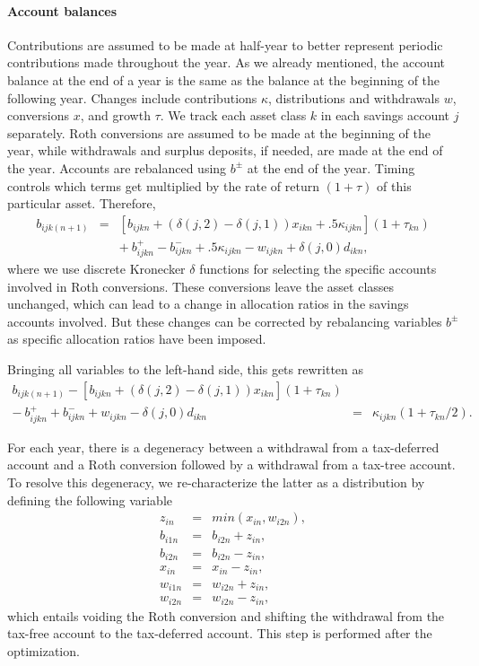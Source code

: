 \documentclass{article}[fleqn,12pt]
\begin{document}
\paragraph*{Account balances}
	Contributions are assumed to be made at half-year to better represent periodic contributions
	made throughout the year. As we already mentioned,
	the account balance at the end of a year is the same as the balance
	at the beginning of the following year.
	Changes include contributions $\kappa$, distributions and withdrawals $w$,
	conversions $x$, and growth $\tau$.
	We track each asset class $k$ in each savings account $j$ separately.
	Roth conversions are assumed to be made at the beginning of the year, while withdrawals
	and surplus deposits, if needed, are made at the end of the year.
	Accounts are rebalanced using $b^{\pm}$ at the end of the year.
	Timing controls which terms get multiplied by the rate of return $(1 + \tau)$
	of this particular asset.
	Therefore,
	\begin{eqnarray}
		\label{Eq:C3a}
		b_{ijk(n+1)} &=& [b_{ijkn} + (\delta(j, 2) - \delta(j, 1))x_{ikn} 
		+ .5\kappa_{ijkn}](1 + \tau_{kn})
		\nonumber \\
		&& 
		+\ b^+_{ijkn} - b^-_{ijkn} 
		+ .5 \kappa_{ijkn} - w_{ijkn} + \delta(j, 0)d_{ikn},
	\end{eqnarray}
	where we use discrete Kronecker $\delta$ functions for selecting the specific accounts involved
	in Roth conversions. These conversions leave the asset classes unchanged, which can lead to a
	change in allocation ratios in the savings accounts involved. But these changes
	can be corrected by rebalancing variables $b^\pm$ as
	specific allocation ratios have been imposed.

	Bringing all variables
	to the left-hand side, this gets rewritten as
	\begin{eqnarray}
		\label{Eq:C3}
		b_{ijk(n+1)} - [b_{ijkn} + (\delta(j, 2) - \delta(j, 1))x_{ikn}](1 + \tau_{kn})
		&& \nonumber \\
		- \ b^+_{ijkn} + b^-_{ijkn} 
		+ w_{ijkn}
		- \delta(j, 0)d_{ikn} 
		&=& \kappa_{ijkn} \left(1 + \tau_{kn}/2\right).
	\end{eqnarray}

	For each year, there is a degeneracy between a withdrawal from a tax-deferred account and a
	Roth conversion followed by a withdrawal from a tax-tree account. To resolve this degeneracy,
	we re-characterize the latter as a distribution by defining the following variable
	\begin{eqnarray}
		z_{in} &=& min(x_{in}, w_{i2n}), \nonumber \\
		b_{i1n} &=& b_{i2n} + z_{in}, \nonumber \\
		b_{i2n} &=& b_{i2n} - z_{in}, \nonumber \\
		x_{in} &=& x_{in} - z_{in}, \nonumber \\
		w_{i1n} &=& w_{i2n} + z_{in}, \nonumber \\
		w_{i2n} &=& w_{i2n} - z_{in}, 
	\end{eqnarray}
	which entails voiding the Roth conversion and shifting the withdrawal from the
	tax-free account to the tax-deferred account. This step is performed after the
	optimization.
\end{document}
